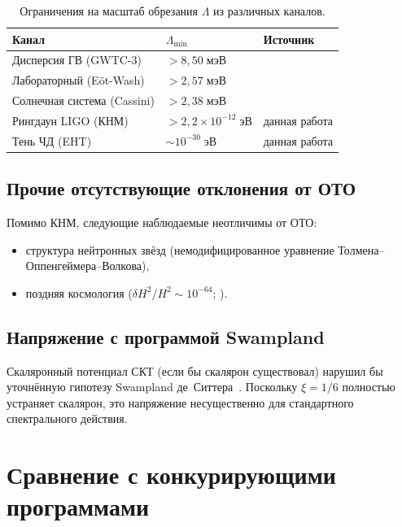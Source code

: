 \documentclass[12pt,a4paper]{article}
\theoremstyle{plain}
\theoremstyle{definition}
\theoremstyle{remark}
\begin{document}
\begin{table}[h]
\centering
\caption{Ограничения на масштаб обрезания $\Lambda$ из различных каналов.}
\label{tab:lambda_bounds}
\begin{tabular}{lll}
\toprule
Канал & $\Lambda_{\min}$ & Источник \\
\midrule
Дисперсия ГВ (GWTC-3) & $> 8{,}50\;\text{мэВ}$ & \cite{GWTC3} \\
Лабораторный (Eöt-Wash) & $> 2{,}57\;\text{мэВ}$ & \cite{Alfyorov:2026paper2} \\
Солнечная система (Cassini) & $> 2{,}38\;\text{мэВ}$ & \cite{Alfyorov:2026paper2} \\
Рингдаун LIGO (КНМ) & $> 2{,}2 \times 10^{-12}\;\text{эВ}$ & данная работа \\
Тень ЧД (EHT) & $\sim 10^{-30}\;\text{эВ}$ & данная работа \\
\bottomrule
\end{tabular}
\end{table}

\subsection{Прочие отсутствующие отклонения от ОТО}
\label{sec:astro_other}

Помимо КНМ, следующие наблюдаемые неотличимы от ОТО:
\begin{itemize}
\item структура нейтронных звёзд (немодифицированное уравнение Толмена--Оппенгеймера--Волкова),
\item поздняя космология ($\delta H^2/H^2 \sim 10^{-64}$;
  \cite{Alfyorov:2026paper4}).
\end{itemize}

\subsection{Напряжение с программой Swampland}
\label{sec:swampland}

Скаляронный потенциал СКТ (если бы скалярон существовал) нарушил бы
уточнённую гипотезу Swampland де~Ситтера~\cite{Obied:2018}.
Поскольку $\xi = 1/6$ полностью устраняет скалярон, это напряжение
несущественно для стандартного спектрального действия.

\section{Сравнение с конкурирующими программами}
\label{sec:comparison}
\end{document}
